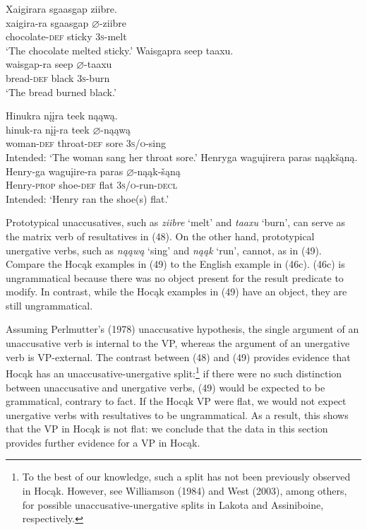 \documentclass[output=paper]{LSP/langsci}
\begin{document}
\begin{exe}
\ex
\begin{xlist}
\ex 
\glll Xaigirara			sgaasgap		ziibre.\\
xaigira-ra			sgaasgap		$\varnothing$-ziibre \\
	chocolate-\textsc{def}	sticky			\textsc{3s}-melt \\
\trans `The chocolate melted sticky.'
\ex 
\glll Waisgapra		seep		taaxu.\\
waisgap-ra		seep		$\varnothing$-taaxu \\
	bread-\textsc{def}		black		\textsc{3s}-burn \\
\trans `The bread burned black.'
\end{xlist}
\end{exe}
\begin{exe}
\ex
\begin{xlist}
\ex 
\glll *Hinukra			n\k{i}\k{i}ra				teek	n\k{a}\k{a}w\k{a}.\\
hinuk-ra			n\k{i}\k{i}-ra				teek	$\varnothing$-n\k{a}\k{a}w\k{a} \\
		woman-\textsc{def}	 throat-\textsc{def}	sore	\textsc{3s/o}-sing \\
\trans Intended: `The woman sang her throat sore.'
\ex 
\glll *Henryga			wagu\k{i}irera		paras		n\k{a}\k{a}k\v{s}\k{a}n\k{a}.\\
Henry-ga		wagu\k{i}ire-ra	paras		$\varnothing$-n\k{a}\k{a}k-\v{s}\k{a}n\k{a} \\
		Henry-\textsc{prop}	shoe-\textsc{def}			flat			\textsc{3s/o}-run-\textsc{decl} \\
\trans Intended: `Henry ran the shoe(s) flat.'
\end{xlist}
\end{exe}

Prototypical unaccusatives, such as \textit{ziibre} `melt' and \textit{taaxu} `burn', can serve as the matrix verb of resultatives in (48). On the other hand, prototypical unergative verbs, such as \textit{n\k{a}\k{a}w\k{a}} `sing' and \textit{n\k{a}\k{a}k} `run', cannot, as in (49). Compare the Hoc\k{a}k examples in (49) to the English example in (46c). (46c) is ungrammatical because there was no object present for the result predicate to modify. In contrast, while the Hoc\k{a}k examples in (49) have an object, they are still ungrammatical.
	
Assuming Perlmutter's (1978) unaccusative hypothesis, the single argument of an unaccusative verb is internal to the VP, whereas the argument of an unergative verb is VP-external. The contrast between (48) and (49) provides evidence that Hoc\k{a}k has an unaccusative-unergative split:\footnote{To the best of our knowledge, such a split has not been previously observed in Hoc\k{a}k. However, see Williamson (1984) and West (2003), among others, for possible unaccusative-unergative splits in Lakota and Assiniboine, respectively.}  if there were no such distinction between unaccusative and unergative verbs, (49) would be expected to be grammatical, contrary to fact. If the Hoc\k{a}k VP were flat, we would not expect unergative verbs with resultatives to be ungrammatical. As a result, this shows that the VP in Hoc\k{a}k is not flat: we conclude that the data in this section provides further evidence for a VP in Hoc\k{a}k.
\end{document}
